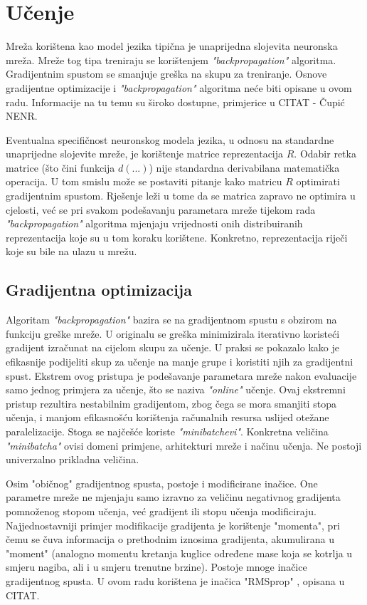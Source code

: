 \documentclass[times, utf8, diplomski, numeric]{fer}
\begin{document}
\section{Učenje}

Mreža korištena kao model jezika tipična je unaprijedna slojevita neuronska mreža. Mreže tog tipa treniraju se korištenjem \textit{"backpropagation"} algoritma. Gradijentnim spustom se smanjuje greška na skupu za treniranje. Osnove gradijentne optimizacije i \textit{"backpropagation"} algoritma neće biti opisane u ovom radu. Informacije na tu temu su široko dostupne, primjerice u CITAT - Čupić NENR.

Eventualna specifičnost neuronskog modela jezika, u odnosu na standardne unaprijedne slojevite mreže, je korištenje matrice reprezentacija $R$. Odabir retka matrice (što čini funkcija $d(...)$) nije standardna derivabilana matematička operacija. U tom smislu može se postaviti pitanje kako matricu $R$ optimirati gradijentnim spustom. Rješenje leži u tome da se matrica zapravo ne optimira u cjelosti, već se pri svakom podešavanju parametara mreže tijekom rada \textit{"backpropagation"} algoritma mjenjaju vrijednosti onih distribuiranih reprezentacija koje su u tom koraku korištene. Konkretno, reprezentacija riječi koje su bile na ulazu u mrežu.

\subsection{Gradijentna optimizacija}

Algoritam \textit{"backpropagation"} bazira se na gradijentnom spustu s obzirom na funkciju greške mreže. U originalu se greška minimizirala iterativno koristeći gradijent izračunat na cijelom skupu za učenje. U praksi se pokazalo kako je efikasnije podijeliti skup za učenje na manje grupe  i koristiti njih za gradijentni spust. Ekstrem ovog pristupa je podešavanje parametara mreže nakon evaluacije samo jednog primjera za učenje, što se naziva \textit{"online"} učenje. Ovaj ekstremni pristup rezultira nestabilnim gradijentom, zbog čega se mora smanjiti stopa učenja, i manjom efikasnošću korištenja računalnih resursa uslijed otežane paralelizacije. Stoga se najčešće koriste \textit{"minibatchevi"}. Konkretna veličina \textit{"minibatcha"} ovisi domeni primjene, arhitekturi mreže i načinu učenja. Ne postoji univerzalno prikladna veličina.

Osim "običnog" gradijentnog spusta, postoje i modificirane inačice. One parametre mreže ne mjenjaju samo izravno za veličinu negativnog gradijenta pomnoženog stopom učenja, već gradijent ili stopu učenja modificiraju. Najjednostavniji primjer modifikacije gradijenta je korištenje "momenta", pri čemu se čuva informacija o prethodnim iznosima gradijenta, akumulirana u "moment" (analogno momentu kretanja kuglice određene mase koja se kotrlja u smjeru nagiba, ali i u smjeru trenutne brzine). Postoje mnoge inačice gradijentnog spusta. U ovom radu korištena je inačica "RMSprop" , opisana u CITAT.
\end{document}
